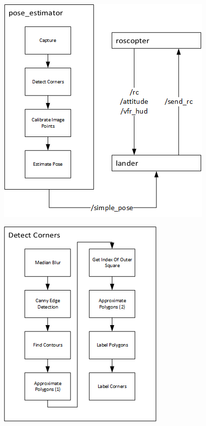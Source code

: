 \documentclass{acm_proc_article-sp}
\begin{document}
\begin{figure}[tb]
\centering
\begin{minipage}{.5\textwidth}
  \centering
  \includegraphics[width=.8\linewidth]{images/flowchart-plain.png}
  \label{fig:flowchart-plain}
\end{minipage}%
\begin{minipage}{.5\textwidth}
  \centering
  \includegraphics[width=.6\linewidth]{images/detectcorners-plain.png}
  \label{fig:detectcorners-plain}
\end{minipage}
\end{figure}
\end{document}
